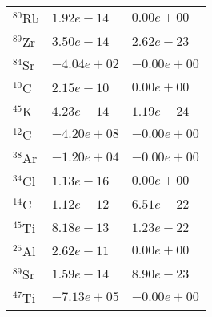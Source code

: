 \begin{tabular}{lll}
 $^{80}$Rb  & $1.92e-14 $                                                        & $0.00e+00 $                                                                     \\
 $^{89}$Zr  & $3.50e-14 $                                                        & $2.62e-23 $                                                                     \\
 $^{84}$Sr  & $-4.04e+02 $                                                       & $-0.00e+00 $                                                                    \\
 $^{10}$C   & $2.15e-10 $                                                        & $0.00e+00 $                                                                     \\
 $^{45}$K   & $4.23e-14 $                                                        & $1.19e-24 $                                                                     \\
 $^{12}$C   & $-4.20e+08 $                                                       & $-0.00e+00 $                                                                    \\
 $^{38}$Ar  & $-1.20e+04 $                                                       & $-0.00e+00 $                                                                    \\
 $^{34}$Cl  & $1.13e-16 $                                                        & $0.00e+00 $                                                                     \\
 $^{14}$C   & $1.12e-12 $                                                        & $6.51e-22 $                                                                     \\
 $^{45}$Ti  & $8.18e-13 $                                                        & $1.23e-22 $                                                                     \\
 $^{25}$Al  & $2.62e-11 $                                                        & $0.00e+00 $                                                                     \\
 $^{89}$Sr  & $1.59e-14 $                                                        & $8.90e-23 $                                                                     \\
 $^{47}$Ti  & $-7.13e+05 $                                                       & $-0.00e+00 $                                                                    \\

\end{tabular}
